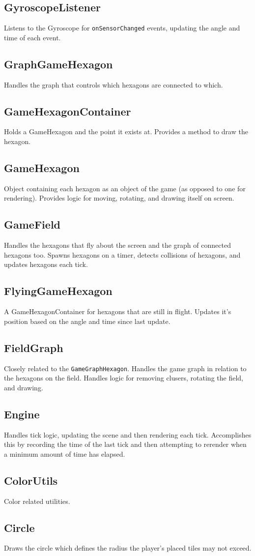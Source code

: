 \documentclass{article}
\begin{document}
\subsection{GyroscopeListener}
Listens to the Gyroscope for \texttt{onSensorChanged} events, updating the angle and time of each event.

\subsection{GraphGameHexagon}
Handles the graph that controls which hexagons are connected to which. 

\subsection{GameHexagonContainer}
Holds a GameHexagon and the point it exists at. Provides a method to draw the hexagon.

\subsection{GameHexagon}
Object containing each hexagon as an object of the game (as opposed to one for rendering). Provides logic for moving, rotating, and drawing itself on screen.

\subsection{GameField}
Handles the hexagons that fly about the screen and the graph of connected hexagons too. Spawns hexagons on a timer, detects collisions of hexagons, and updates hexagons each tick.

\subsection{FlyingGameHexagon}
A GameHexagonContainer for hexagons that are still in flight. Updates it's position based on the angle and  time since last update.

\subsection{FieldGraph}
Closely related to the \texttt{GameGraphHexagon}. Handles the game graph in relation to the hexagons on the field. Handles logic for removing clusers, rotating the field, and drawing.

\subsection{Engine}
Handles tick logic, updating the scene and then rendering each tick. Accomplishes this by recording the time of the last tick and then attempting to rerender when a minimum amount of time has elapsed.

\subsection{ColorUtils}
Color related utilities.

\subsection{Circle}
Draws the circle which defines the radius the player's placed tiles may not exceed.
\end{document}
